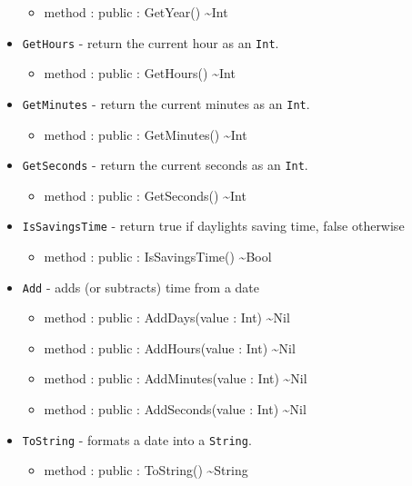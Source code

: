 \documentclass[11pt]{article}
\begin{document}
\begin{itemize}
  \begin{itemize}
  \item method : public : GetYear() \textasciitilde Int
  \end{itemize}
\item \texttt{GetHours} - return the current hour as an \texttt{Int}.
  \begin{itemize}
  \item method : public : GetHours() \textasciitilde Int
  \end{itemize}
\item \texttt{GetMinutes} - return the current minutes as an
  \texttt{Int}.
  \begin{itemize}
  \item method : public : GetMinutes() \textasciitilde Int
  \end{itemize}
\item \texttt{GetSeconds} - return the current seconds as an
  \texttt{Int}.
  \begin{itemize}
  \item method : public : GetSeconds() \textasciitilde Int
  \end{itemize}
\item \texttt{IsSavingsTime} - return true if daylights saving time,
  false otherwise
  \begin{itemize}
  \item method : public : IsSavingsTime() \textasciitilde Bool
  \end{itemize}
\item \texttt{Add} - adds (or subtracts) time from a date
  \begin{itemize}
  \item method : public : AddDays(value : Int) \textasciitilde Nil
  \item method : public : AddHours(value : Int) \textasciitilde Nil
  \item method : public : AddMinutes(value : Int) \textasciitilde Nil
  \item method : public : AddSeconds(value : Int) \textasciitilde Nil
  \end{itemize}
\item \texttt {ToString} - formats a date into a \texttt{String}.
  \begin{itemize}
  \item method : public : ToString() \textasciitilde String
  \end{itemize}
\end{itemize}
\end{document}
